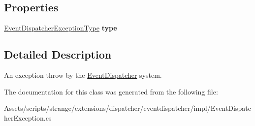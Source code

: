 \subsection*{Properties}
\begin{DoxyCompactItemize}
\item 
\hypertarget{classstrange_1_1extensions_1_1dispatcher_1_1eventdispatcher_1_1impl_1_1_event_dispatcher_exception_a9e589f2c5891b9838d7e9d5b6fe9600f}{\hyperlink{namespacestrange_1_1extensions_1_1dispatcher_1_1eventdispatcher_1_1api_ac82e4192fcc43ba5e64f0469a3c7c06d}{Event\-Dispatcher\-Exception\-Type} {\bfseries type}}\label{classstrange_1_1extensions_1_1dispatcher_1_1eventdispatcher_1_1impl_1_1_event_dispatcher_exception_a9e589f2c5891b9838d7e9d5b6fe9600f}

\end{DoxyCompactItemize}


\subsection{Detailed Description}
An exception throw by the \hyperlink{classstrange_1_1extensions_1_1dispatcher_1_1eventdispatcher_1_1impl_1_1_event_dispatcher}{Event\-Dispatcher} system. 

The documentation for this class was generated from the following file\-:\begin{DoxyCompactItemize}
\item 
Assets/scripts/strange/extensions/dispatcher/eventdispatcher/impl/Event\-Dispatcher\-Exception.\-cs\end{DoxyCompactItemize}
